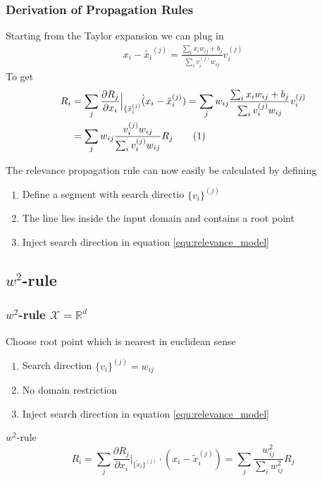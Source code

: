 \documentclass{beamer}
\newcommand\numberthis{\addtocounter{equation}{1}\tag{\theequation}}
\begin{document}
\begin{frame}
\frametitle{Derivation of Propagation Rules}
\vspace{0.4cm}
Starting from the Taylor expansion we can plug in 
\begin{align*}
x_i - \tilde{x_i}^{(j)} = \frac{\sum_i x_i w_{ij} + b_j}{\sum_i v_i^{(j)} w_{ij}} v_i^{(j)}
\end{align*}
\vspace{-0.2cm}
To get
\vspace{-0.2cm}
\begin{align*}
R_i & = \sum_j \frac{\partial R_j}{\partial x_i}\Big|_{\{\tilde{x}_i^{(j)}} \dot (x_i - \tilde{x}_i^{(j)})= \sum_j w_{ij}\frac{\sum_i x_i w_{ij} + b_j}{\sum_i v_i^{(j)} w_{ij}} v_i^{(j)}\\
&= \sum_j w_{ij}\frac{v_i^{(j)} w_{ij}}{\sum_i v_i^{(j)} w_{ij}} R_j \numberthis \label{equ:relevance_model}
\end{align*}

The relevance propagation rule can now easily be calculated by defining
\begin{enumerate}
	\item Define a segment with search directio $\{v_i\}^{(j)}$
	\item The line lies inside the input domain and contains a root point
	\item Inject search direction in equation \eqref{equ:relevance_model}
\end{enumerate}
\end{frame}




\subsection[$w^2$-rule]{$w^2$-rule}


\begin{frame}
\frametitle{$w^2$-rule $\mathcal{X}=\mathbb{R}^d$}
Choose root point which is nearest in euclidean sense\\
\begin{enumerate}
	\item Search direction $\{v_i\}^{(j)} = w_{ij}$
	\item No domain restriction
	\item Inject search direction in equation \eqref{equ:relevance_model}
\end{enumerate}

\begin{block}{$w^2$-rule}
\begin{equation*}
R_i =\sum_j\frac{\partial R_j}{\partial x_i}\Big|_{\{\tilde{x}_i\}^{(j)}} \cdot (x_i - \tilde{x}_i^{(j)}) =  \sum_j\frac{w_{ij}^2}{\sum_i w_{ij}^2} R_j
\end{equation*}
\end{block}



\end{frame}
\end{document}
